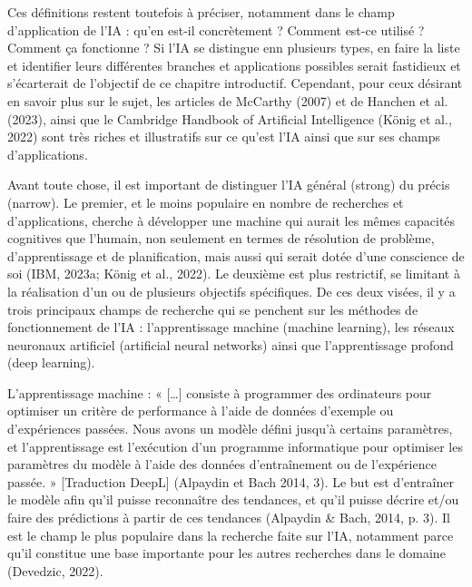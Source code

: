 \documentclass[
  letterpaper,
  DIV=11,
  numbers=noendperiod]{scrreprt}
\begin{document}
Ces définitions restent toutefois à préciser, notamment dans le champ
d'application de l'IA : qu'en est-il concrètement ? Comment est-ce
utilisé ? Comment ça fonctionne ? Si l'IA se distingue enn plusieurs
types, en faire la liste et identifier leurs différentes branches et
applications possibles serait fastidieux et s'écarterait de l'objectif
de ce chapitre introductif. Cependant, pour ceux désirant en savoir plus
sur le sujet, les articles de McCarthy (2007) et de Hanchen et al.
(2023), ainsi que le Cambridge Handbook of Artificial Intelligence
(König et al., 2022) sont très riches et illustratifs sur ce qu'est l'IA
ainsi que sur ses champs d'applications.

Avant toute chose, il est important de distinguer l'IA général (strong)
du précis (narrow). Le premier, et le moins populaire en nombre de
recherches et d'applications, cherche à développer une machine qui
aurait les mêmes capacités cognitives que l'humain, non seulement en
termes de résolution de problème, d'apprentissage et de planification,
mais aussi qui serait dotée d'une conscience de soi (IBM, 2023a; König
et al., 2022). Le deuxième est plus restrictif, se limitant à la
réalisation d'un ou de plusieurs objectifs spécifiques. De ces deux
visées, il y a trois principaux champs de recherche qui se penchent sur
les méthodes de fonctionnement de l'IA : l'apprentissage machine
(machine learning), les réseaux neuronaux artificiel (artificial neural
networks) ainsi que l'apprentissage profond (deep learning).

L'apprentissage machine : « {[}\ldots{]} consiste à programmer des
ordinateurs pour optimiser un critère de performance à l'aide de données
d'exemple ou d'expériences passées. Nous avons un modèle défini jusqu'à
certains paramètres, et l'apprentissage est l'exécution d'un programme
informatique pour optimiser les paramètres du modèle à l'aide des
données d'entraînement ou de l'expérience passée. » {[}Traduction
DeepL{]} (Alpaydin et Bach 2014, 3). Le but est d'entraîner le modèle
afin qu'il puisse reconnaître des tendances, et qu'il puisse décrire
et/ou faire des prédictions à partir de ces tendances (Alpaydin \& Bach,
2014, p. 3). Il est le champ le plus populaire dans la recherche faite
sur l'IA, notamment parce qu'il constitue une base importante pour les
autres recherches dans le domaine (Devedzic, 2022).
\end{document}
